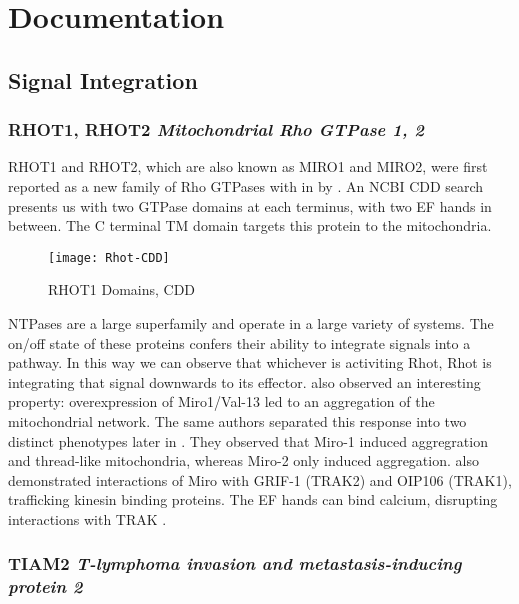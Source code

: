 \section{Documentation}

\subsection{Signal Integration}

\subsubsection{RHOT1, RHOT2 \textit{Mitochondrial Rho GTPase 1, 2}}

RHOT1 and RHOT2, which are also known as MIRO1 and MIRO2, were first reported as
a new family of Rho GTPases with in \citeyear{Fransson2003} by
\citeauthor{Fransson2003}. An NCBI CDD search presents us with two GTPase
domains at each terminus, with two EF hands in between. The C terminal TM domain
targets this protein to the mitochondria.

\begin{figure}[h]
  \centering
    \texttt{[image: Rhot-CDD]}
  \caption{RHOT1 Domains, CDD}
\end{figure}

NTPases are a large superfamily and operate in a large variety of systems. The
on/off state of these proteins confers their ability to integrate signals into a
pathway. In this way we can observe that whichever is activiting Rhot, Rhot is
integrating that signal downwards to its effector. \citeauthor{Fransson2003}
also observed an interesting property: overexpression of Miro1/Val-13 led to
an aggregation of the mitochondrial network. The same authors separated this
response into two distinct phenotypes later in \citeyear{Fransson2006}. They
observed that Miro-1 induced aggregration and thread-like mitochondria, whereas
Miro-2 only induced aggregation. \citeauthor{Fransson2006} also demonstrated
interactions of Miro with GRIF-1 (TRAK2) and OIP106 (TRAK1), trafficking
kinesin binding proteins. The EF hands can bind calcium,
disrupting interactions with TRAK \citep{Reis2009}.


\subsubsection{TIAM2 \textit{T-lymphoma invasion and metastasis-inducing protein 2}}

